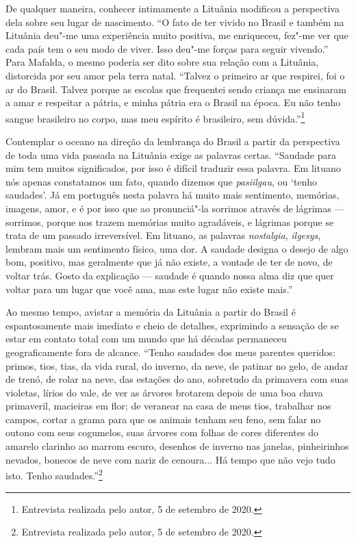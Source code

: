 De qualquer maneira, conhecer intimamente a Lituânia modificou a perspectiva 
dela sobre seu lugar de nascimento. ``O fato de ter vivido no Brasil e também na Lituânia deu"-me
uma experiência muito positiva, me enriqueceu, fez"-me ver que cada país
tem o seu modo de viver. Isso deu"-me forças para seguir vivendo.'' Para
Mafalda, o mesmo poderia ser dito sobre sua relação com a Lituânia,
distorcida por seu amor pela terra natal. ``Talvez o primeiro ar que
respirei, foi o ar do Brasil. Talvez porque as escolas que frequentei
sendo criança me ensinaram a amar e respeitar a pátria, e minha pátria
era o Brasil na época. Eu não tenho sangue brasileiro no corpo, mas meu
espírito é brasileiro, sem dúvida.''\footnote{Entrevista realizada pelo autor, 5 de setembro de 2020.}

Contemplar o oceano na direção da lembrança do Brasil a partir da
perspectiva de toda uma vida passada na Lituânia exige as palavras
certas. ``Saudade para mim tem muitos significados, por isso é difícil
traduzir essa palavra. Em lituano nós apenas constatamos um fato, quando
dizemos que \textit{pasiilgau}, ou `tenho saudades'. Já em português nesta
palavra há muito mais sentimento, memórias, imagens, amor, e é por
isso que ao pronunciá"-la sorrimos através de lágrimas --- sorrimos,
porque nos trazem memórias muito agradáveis, e lágrimas porque se trata
de um passado irreversível. Em lituano, as palavras
\textit{nostalgia}, \textit{ilgesys}, lembram mais um sentimento
físico, uma dor. A saudade designa o desejo de algo bom, positivo, mas
geralmente que já não existe, a vontade de ter de novo, de voltar trás.
Gosto da explicação --- saudade é quando nossa alma diz que quer voltar
para um lugar que você ama, mas este lugar não existe mais.''

Ao mesmo
tempo, avistar a memória da Lituânia a partir do Brasil é espantosamente
mais imediato e cheio de detalhes, exprimindo a sensação de se estar em
contato total com um mundo que há décadas permaneceu geograficamente
fora de alcance. ``Tenho saudades dos meus parentes queridos: primos,
tios, tias, da vida rural, do inverno, da neve, de patinar no gelo, de
andar de trenó, de rolar na neve, das estações do ano, sobretudo da
primavera com suas violetas, lírios do vale, de ver as árvores brotarem
depois de uma boa chuva primaveril, macieiras em flor; de veranear na
casa de meus tios, trabalhar nos campos, cortar a grama para que os
animais tenham seu feno, sem falar no outono com seus cogumelos, suas
árvores com folhas de cores diferentes do amarelo clarinho ao marrom
escuro, desenhos de inverno nas janelas, pinheirinhos nevados, bonecos
de neve com nariz de cenoura... Há tempo que não vejo tudo isto. Tenho
saudades.''\footnote{Entrevista realizada pelo autor, 5 de setembro de
  2020.}

